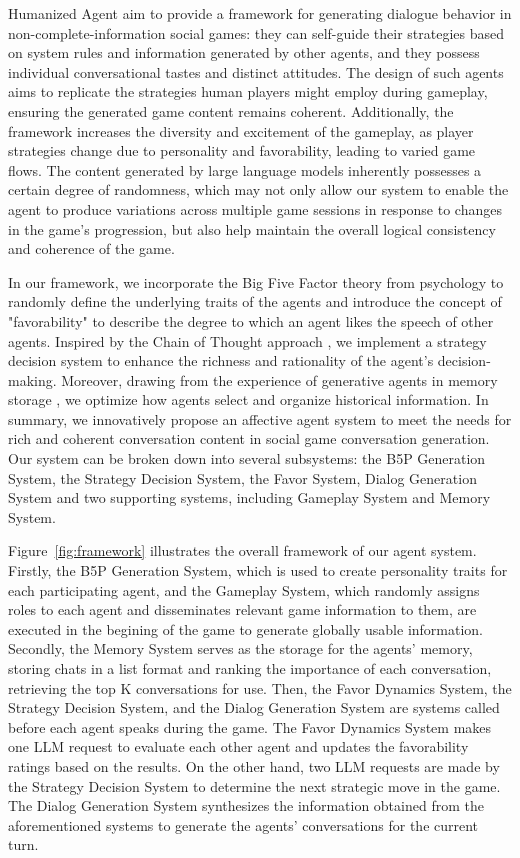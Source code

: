 Humanized Agent aim to provide a framework for generating dialogue behavior in non-complete-information social games: they can self-guide their strategies based on system rules and information generated by other agents, and they possess individual conversational tastes and distinct attitudes. The design of such agents aims to replicate the strategies human players might employ during gameplay, ensuring the generated game content remains coherent. Additionally, the framework increases the diversity and excitement of the gameplay, as player strategies change due to personality and favorability, leading to varied game flows. The content generated by large language models inherently possesses a certain degree of randomness, which may not only allow our system to enable the agent to produce variations across multiple game sessions in response to changes in the game's progression, but also help maintain the overall logical consistency and coherence of the game.

In our framework, we incorporate the Big Five Factor theory from psychology to randomly define the underlying traits of the agents and introduce the concept of "favorability" to describe the degree to which an agent likes the speech of other agents. Inspired by the Chain of Thought approach \citep{wei2022chain}, we implement a strategy decision system to enhance the richness and rationality of the agent's decision-making. Moreover, drawing from the experience of generative agents in memory storage \citep{park2023generative}, we optimize how agents select and organize historical information. In summary, we innovatively propose an affective agent system to meet the needs for rich and coherent conversation content in social game conversation generation. Our system can be broken down into several subsystems: the B5P Generation System, the Strategy Decision System, the Favor System, Dialog Generation System and two supporting systems, including Gameplay System and Memory System.


Figure~\ref{fig:framework} illustrates the overall framework of our agent system. Firstly, the B5P Generation System, which is used to create personality traits for each participating agent, and the Gameplay System, which randomly assigns roles to each agent and disseminates relevant game information to them, are executed in the begining of the game to generate globally usable information.  Secondly, the Memory System serves as the storage for the agents' memory, storing chats in a list format and ranking the importance of each conversation, retrieving the top K conversations for use. Then, the Favor Dynamics System, the Strategy Decision System, and the Dialog Generation System are systems called before each agent speaks during the game. The Favor Dynamics System makes one LLM request to evaluate each other agent and updates the favorability ratings based on the results. On the other hand, two LLM requests are made by the Strategy Decision System  to determine the next strategic move in the game. The Dialog Generation System synthesizes the information obtained from the aforementioned systems to generate the agents' conversations for the current turn.


